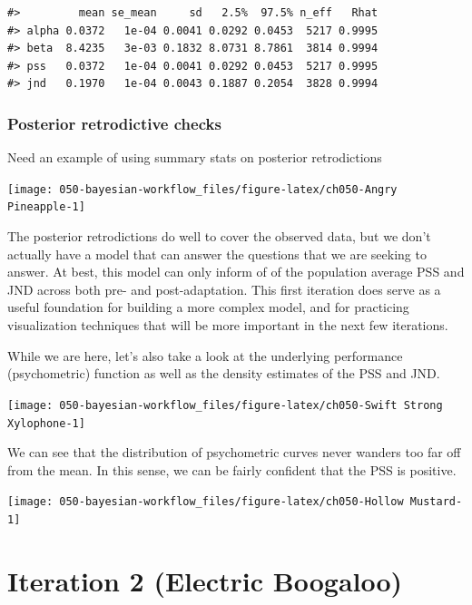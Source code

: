 \documentclass[11pt, oneside, openany]{scrbook}
\begin{document}
\begin{verbatim}
#>         mean se_mean     sd   2.5%  97.5% n_eff   Rhat
#> alpha 0.0372   1e-04 0.0041 0.0292 0.0453  5217 0.9995
#> beta  8.4235   3e-03 0.1832 8.0731 8.7861  3814 0.9994
#> pss   0.0372   1e-04 0.0041 0.0292 0.0453  5217 0.9995
#> jnd   0.1970   1e-04 0.0043 0.1887 0.2054  3828 0.9994
\end{verbatim}


\hypertarget{iter1-post-retro}{%
\subsubsection{Posterior retrodictive checks}\label{iter1-post-retro}}

Need an example of using summary stats on posterior retrodictions

\begin{center}\texttt{[image: 050-bayesian-workflow\_files/figure-latex/ch050-Angry Pineapple-1]} \end{center}

The posterior retrodictions do well to cover the observed data, but we don't actually have a model that can answer the questions that we are seeking to answer. At best, this model can only inform of of the population average PSS and JND across both pre- and post-adaptation. This first iteration does serve as a useful foundation for building a more complex model, and for practicing visualization techniques that will be more important in the next few iterations.

While we are here, let's also take a look at the underlying performance (psychometric) function as well as the density estimates of the PSS and JND.

\begin{center}\texttt{[image: 050-bayesian-workflow\_files/figure-latex/ch050-Swift Strong Xylophone-1]} \end{center}

We can see that the distribution of psychometric curves never wanders too far off from the mean. In this sense, we can be fairly confident that the PSS is positive.

\begin{center}\texttt{[image: 050-bayesian-workflow\_files/figure-latex/ch050-Hollow Mustard-1]} \end{center}

\hypertarget{iter2}{%
\section{Iteration 2 (Electric Boogaloo)}\label{iter2}}
\end{document}
